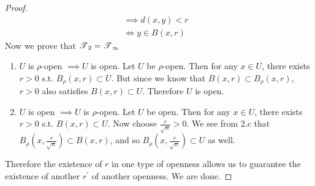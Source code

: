 \begin{proof}
\begin{align}
                                               & \implies d(x, y) < r && \tag{transitivity from 2.b}\\
                                               & \iff y \in B(x, r)
        \end{align}
        Now we prove that $\T_2 = \T_\infty$
        \begin{enumerate}
          \item $U$ is $\rho$-open $\implies U$ is open. Let $U$ be $\rho$-open. Then for any $x \in U$, there exists $r > 0$ s.t. $B_\rho (x, r) \subset U$. But since we know that $B(x, r) \subset B_\rho (x, r)$, $r > 0$ also satisfies $B(x, r) \subset U$. Therefore $U$ is open. 

          \item $U$ is open $\implies U$ is $\rho$-open. Let $U$ be open. Then for any $x \in U$, there exists $r > 0$ s.t. $B(x, r) \subset U$. Now choose $\frac{r}{\sqrt{n}} > 0$. We see from 2.c that $B_\rho (x, \frac{r}{\sqrt{n}}) \subset B(x, r)$, and so $B_\rho (x, \frac{r}{\sqrt{n}}) \subset U$ as well.  
        \end{enumerate}
        Therefore the existence of $r$ in one type of openness allows us to guarantee the existence of another $r^\prime$ of another openness. We are done. 
      \end{proof}

